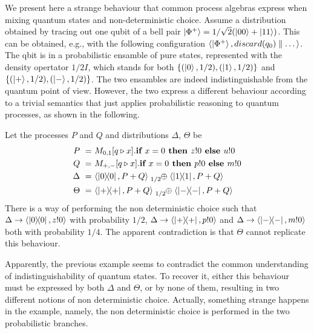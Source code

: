 We present here a strange behaviour that common process algebras express when mixing quantum states and non-deterministic choice.
Assume a distribution obtained by tracing out one qubit of a bell pair $\ket{\Phi^+} = 1/\sqrt{2}(\ket{00} + \ket{11})$.
This can be obtained, e.g., with the following configuration $\langle\ket{\Phi^+}, discard(q_0) \parallel \dots\rangle$.
The qbit is in a probabilistic ensamble of pure states, represented with the density opertator $1/2 I$, which stands for both $\{(\ket{0}, 1/2), (\ket{1}, 1/2)\}$ and $\{(\ket{+}, 1/2), (\ket{-}, 1/2)\}$.
The two ensambles are indeed indistinguishable from the quantum point of view.
However, the two express a different behaviour according to a trivial semantics that just applies probabilistic reasoning to quantum processes, as shown in the following.
\begin{example}
	Let the processes $P$ and $Q$ and distributions $\Delta$, $\Theta$ be
	\begin{align*}
		P\ =\ &M_{0,1}[q \triangleright x] . \ite{x=0}{z!0}{u!0}\\
		Q\ =\ &M_{+,-}[q \triangleright x] . \ite{x=0}{p!0}{m!0}\\
		\Delta\ =\ &\confw{\ketbra{0}{0}, P + Q} \psum{1/2} \confw{\ketbra{1}{1}, P + Q}\\
		\Theta\ =\ &\confw{\ketbra{+}{+}, P + Q} \psum{1/2} \confw{\ketbra{-}{-}, P + Q}
	\end{align*}
	There is a way of performing the non deterministic choice such that $\Delta \rightarrow \langle\ket{0}\!\!\bra{0}, z!0\rangle$ with probability $1/2$, $\Delta \rightarrow \langle\ket{+}\!\!\bra{+}, p!0\rangle$ and $\Delta \rightarrow \langle\ket{-}\!\!\bra{-}, m!0\rangle$ both with probability $1/4$.
	The apparent contradiction is that $\Theta$ cannot replicate this behaviour.
\end{example}

Apparently, the previous example seems to contradict the common understanding of indistinguishability of quantum states.
To recover it, either this behaviour must be expressed by both $\Delta$ and $\Theta$, or by none of them, resulting in two different notions of non deterministic choice.
Actually, something strange happens in the example, namely, the non deterministic choice is performed in the two probabilistic branches.
